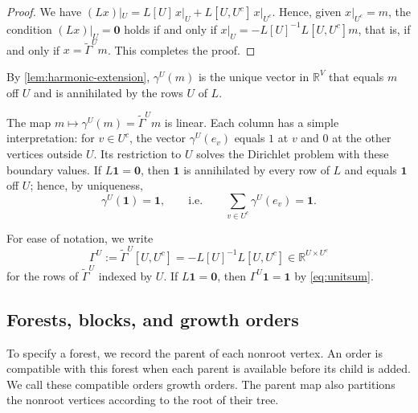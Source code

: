 \documentclass[onefignum,onetabnum,nohypdvips]{siamart250211}
\numberwithin{theorem}{section}
\numberwithin{equation}{section}
\newcommand{\R}{\mathbb{R}}
\newcommand{\one}{\mathbf{1}}
\newcommand{\zero}{\mathbf{0}}
\begin{document}
\begin{proof}
We have $(Lx)|_U=L[U]\,x|_U+L[U,U^c]\,x|_{U^c}$. Hence, given
$x|_{U^c}=m$, the condition $(Lx)|_U=\zero$ holds if and only if
$x|_U=-L[U]^{-1}L[U,U^c]m$, that is, if and only if $x=\tilde\Gamma^Um$.
This completes the proof.
\end{proof}




\begin{remark}
By \cref{lem:harmonic-extension}, $\gamma^U(m)$ is the unique vector in
$\R^V$ that equals $m$ off $U$ and is annihilated by the rows $U$ of
$L$.
\end{remark}

The map $m\mapsto\gamma^U(m)=\tilde\Gamma^Um$ is linear. Each column
has a simple interpretation: for $v\in U^c$, the vector
$\gamma^U(e_v)$ equals $1$ at $v$ and $0$ at the other vertices
outside $U$. Its restriction to $U$ solves the Dirichlet problem with
these boundary values. If
$L\one=\zero$, then $\one$ is annihilated by every row of $L$ and equals
$\one$ off $U$; hence, by uniqueness,
\begin{equation}\label{eq:unitsum}
\gamma^{U}(\one)=\one,\qquad\text{i.e.}\qquad
\sum_{v\in U^c}\gamma^{U}(e_v)=\one .
\end{equation}

For ease of notation, we write
\begin{equation}\label{eq:Gamma}
\Gamma^U:=\tilde\Gamma^U[U,U^c]=-L[U]^{-1}L[U,U^c]\in\R^{U\times U^c}
\end{equation}
for the rows of $\tilde\Gamma^U$ indexed by $U$. If $L\one=\zero$, then
$\Gamma^U\one=\one$ by \eqref{eq:unitsum}.

\subsection{Forests, blocks, and growth orders}\label{sec:combdef}

To specify a forest, we record the parent of each nonroot vertex.
An order is compatible with this forest when each parent is available
before its child is added. We call these compatible orders growth
orders. The parent map also partitions the nonroot vertices according
to the root of their tree.
\end{document}
